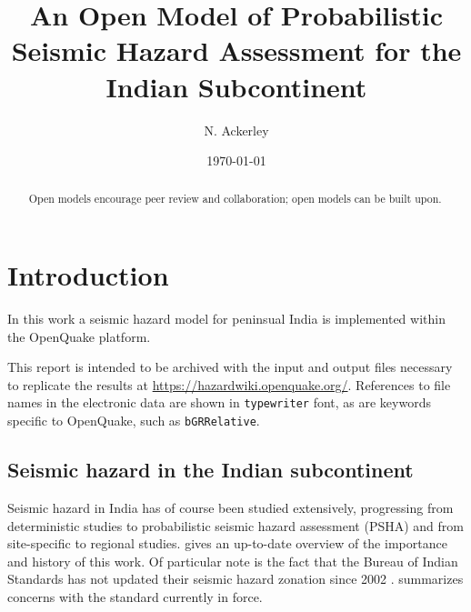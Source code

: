 \documentclass{article}
\begin{document}
\title{An Open Model of Probabilistic Seismic Hazard Assessment for the Indian Subcontinent}
\date{\today}

\setcounter{Maxaffil}{0} %
\author[1,2]{N. Ackerley}

\maketitle

\begin{abstract}
Open models encourage peer review and collaboration; open models can be built upon.
\end{abstract}

\tableofcontents
\listoffigures
\listoftables

\section{Introduction}
\label{sec:Introduction}

In this work a seismic hazard model for peninsual India \cite{nath2012probabilistic} is implemented within the OpenQuake \citep{weatherill2014openquake,crowley2015openquake} platform.

This report is intended to be archived with the input and output files necessary to replicate the results at \url{https://hazardwiki.openquake.org/}. References to file names in the electronic data are shown in \texttt{typewriter} font, as are keywords specific to OpenQuake, such as \texttt{bGRRelative}.

\subsection{Seismic hazard in the Indian subcontinent}
\label{subsec:PshaIndia}

Seismic hazard in India has of course been studied extensively, progressing from deterministic studies to probabilistic seismic hazard assessment (PSHA) and from site-specific to regional studies. \cite{ashish2016probabilistic} gives an up-to-date overview of the importance and history of this work. Of particular note is the fact that the Bureau of Indian Standards has not updated their seismic hazard zonation since 2002 \citep{bis2002criteria}. \cite{nath2012probabilistic} summarizes concerns with the standard currently in force.
\end{document}
